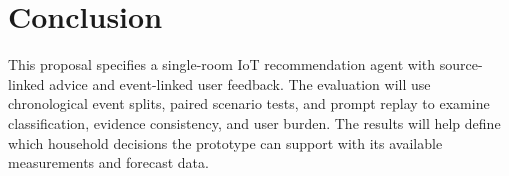 \section{Conclusion}
This proposal specifies a single-room IoT recommendation agent with source-linked advice and event-linked user feedback. The evaluation will use chronological event splits, paired scenario tests, and prompt replay to examine classification, evidence consistency, and user burden. The results will help define which household decisions the prototype can support with its available measurements and forecast data.

